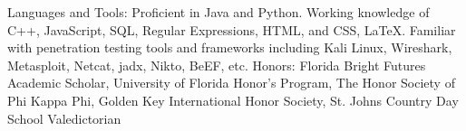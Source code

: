 




\begin{cvhonors}

  \cvhonor
    {Languages and Tools:} %
    {Proficient in Java and Python. Working knowledge of C++, JavaScript, SQL, Regular Expressions, HTML, and CSS, LaTeX. Familiar with penetration testing tools and frameworks including  Kali Linux, Wireshark, Metasploit, Netcat, jadx, Nikto, BeEF, etc.} %
    {} %
    {} %
      \cvhonor
    {Honors:} %
    {Florida Bright Futures Academic Scholar, University of Florida Honor's Program, The Honor Society of Phi Kappa Phi, Golden Key International Honor Society, St. Johns Country Day School Valedictorian} %
    {} %
    {} %

\end{cvhonors}


